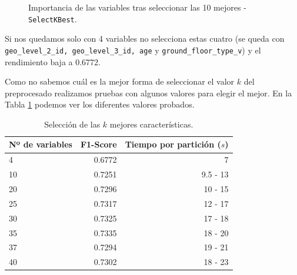 \documentclass[a4paper, 20pt]{article}
\begin{document}
\begin{figure}[H]
    \centering
    \caption{Importancia de las variables tras seleccionar las 10 mejores - \texttt{SelectKBest}.}
    \label{fig:lgbm_imp_05_10}
\end{figure}

Si nos quedamos solo con 4 variables no selecciona estas cuatro (se queda con \texttt{geo\_level\_2\_id, geo\_level\_3\_id, age} y \texttt{ground\_floor\_type\_v}) y el rendimiento baja a 0.6772.

Como no sabemos cuál es la mejor forma de seleccionar el valor $k$ del preprocesado realizamos pruebas con algunos valores para elegir el mejor. En la Tabla \ref{tab:05_k} podemos ver los diferentes valores probados.

\begin{table}[H]
\centering
\caption{Selección de las $k$ mejores características.}
\label{tab:05_k}
\begin{tabular}{lrr}
\toprule
Nº de variables & F1-Score & Tiempo por partición ($s$)\\
\midrule
4 & 0.6772 & ~7\\
10 & 0.7251 & 9.5 - 13\\
20 & 0.7296 & 10 - 15\\
25 & 0.7317 & 12 - 17\\
30 & 0.7325 & 17 - 18\\
35 & 0.7335 & 18 - 20\\
37 & 0.7294 & 19 - 21\\
40 & 0.7302 & 18 - 23\\
\bottomrule
\end{tabular}
\end{table}
\end{document}

